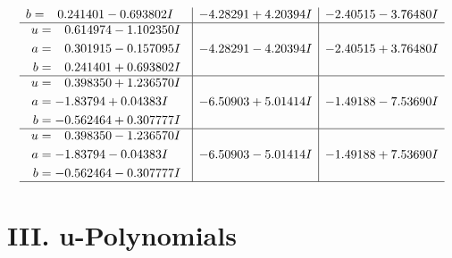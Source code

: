 \documentclass[1p]{elsarticle_modified}
\theoremstyle{definition}
\begin{document}
$$\begin{array}{c|c|c}
\begin{aligned}
b &= \phantom{-}0.241401 - 0.693802 I\end{aligned}
 & -4.28291 + 4.20394 I & -2.40515 - 3.76480 I \\ \hline\begin{aligned}
u &= \phantom{-}0.614974 - 1.102350 I \\
a &= \phantom{-}0.301915 - 0.157095 I \\
b &= \phantom{-}0.241401 + 0.693802 I\end{aligned}
 & -4.28291 - 4.20394 I & -2.40515 + 3.76480 I \\ \hline\begin{aligned}
u &= \phantom{-}0.398350 + 1.236570 I \\
a &= -1.83794 + 0.04383 I \\
b &= -0.562464 + 0.307777 I\end{aligned}
 & -6.50903 + 5.01414 I & -1.49188 - 7.53690 I \\ \hline\begin{aligned}
u &= \phantom{-}0.398350 - 1.236570 I \\
a &= -1.83794 - 0.04383 I \\
b &= -0.562464 - 0.307777 I\end{aligned}
 & -6.50903 - 5.01414 I & -1.49188 + 7.53690 I\\
 \hline 
 \end{array}$$\newpage
\newpage\renewcommand{\arraystretch}{1}
\centering \section*{ III. u-Polynomials}
\end{document}
